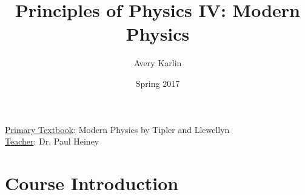 \documentclass[11 pt, twoside]{article}
\begin{document}
\title{Principles of Physics IV: Modern Physics}
\author{Avery Karlin}
\date{Spring 2017}
\newcommand{\textbook}{Modern Physics by Tipler and Llewellyn}
\newcommand{\teacher}{Dr. Paul Heiney}

\maketitle
\newpage
\hypertarget{content}{\tableofcontents}
\vspace{11pt}
\noindent
\underline{Primary Textbook}: \textbook\\
\underline{Teacher}: \teacher
\newpage

\section{Course Introduction}
\end{document}
